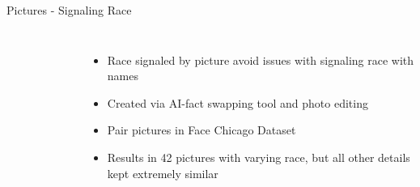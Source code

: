 \documentclass[10pt]{beamer}
\begin{document}
  
\begin{frame}{Pictures - Signaling Race}
\label{pic examples}
\begin{columns}
\begin{figure}[h!]
\begin{minipage}{1\columnwidth}
\captionsetup[subfloat]{labelformat=empty}
\end{minipage}
\end{figure}

\begin{itemize}
\item Race signaled by picture \rightarrow avoid issues with signaling race with names
\item Created via AI-fact swapping tool and photo editing
\item Pair pictures in Face Chicago Dataset
\item Results in 42 pictures with varying race, but all other details kept extremely similar
\end{itemize}
\end{columns}
\vspace{-0.5cm}
\hfill \hyperlink{pic_Manipulation}{} \hyperlink{all_pic}{} 
\end{frame}
\end{document}
